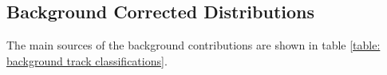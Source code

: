 \subsection{Background Corrected Distributions}
\label{subsection: charged particle density, background corrected distributions}

%

The main sources of the background contributions are shown in table \ref{table: background track classifications}.


%
%

